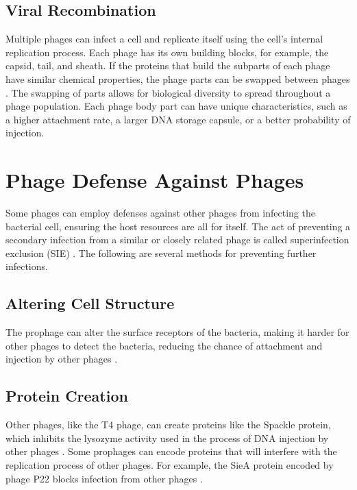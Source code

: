 \subsection{Viral Recombination}
Multiple phages can infect a cell and replicate itself using the cell's internal replication process. 
Each phage has its own building blocks, for example, the capsid, tail, and sheath. 
If the proteins that build the subparts of each phage have similar chemical properties, the phage parts can be swapped between phages \cite{aksyukBacteriophageAssembly2011}. 
The swapping of parts allows for biological diversity to spread throughout a phage population. 
Each phage body part can have unique characteristics, such as a higher attachment rate, a larger DNA storage capsule, or a better probability of injection. 


\section{Phage Defense Against Phages}
Some phages can employ defenses against other phages from infecting the bacterial cell, ensuring the host resources are all for itself. 
The act of preventing a secondary infection from a similar or closely related phage is called superinfection exclusion (SIE) \cite{patelAntiphageDefenceInhibition2024}. 
The following are several methods for preventing further infections. 

\subsection{Altering Cell Structure}
The prophage can alter the surface receptors of the bacteria, making it harder for other phages to detect the bacteria, reducing the chance of attachment and injection by other phages \cite{bucherPhageMachineSIEence2024}. 

\subsection{Protein Creation}
Other phages, like the T4 phage, can create proteins like the Spackle protein, which inhibits the lysozyme activity used in the process of DNA injection by other phages \cite{bucherPhageMachineSIEence2024, kanamaruStructureFunctionT42020}. 
Some prophages can encode proteins that will interfere with the replication process of other phages. 
For example, the SieA protein encoded by phage P22 blocks infection from other phages \cite{leavittBacteriophageP22SieAmediated2024}. 


